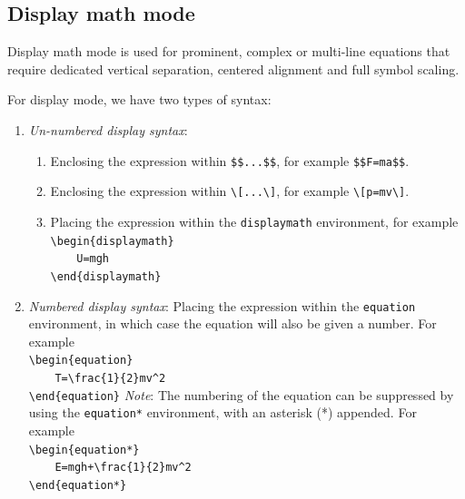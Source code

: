 	
	\newpage
	\subsection{Display math mode}
		Display math mode is used for prominent, complex or multi-line equations that require dedicated vertical separation, centered alignment and full symbol scaling.
		
		For display mode, we have two types of syntax:
		\begin{enumerate}
			\item \emph{Un-numbered display syntax}:
			\begin{enumerate}
				\item Enclosing the expression within \lstinline|$$...$$|, for example \lstinline|$$F=ma$$|.
				\item Enclosing the expression within \lstinline|\[...\]|, for example \lstinline|\[p=mv\]|.
				\item Placing the expression within the \lstinline|displaymath| environment, for example\\
				\lstinline|\begin{displaymath}|\\
					\lstinline|    U=mgh|\\
					\lstinline|\end{displaymath}|
			\end{enumerate}
			
			\item \emph{Numbered display syntax}: Placing the expression within the \lstinline|equation| environment, in which case the equation will also be given a number. For example\\
			\lstinline|\begin{equation}|\\
				\lstinline|    T=\frac{1}{2}mv^2|\\
			\lstinline|\end{equation}|
			\emph{Note}: The numbering of the equation can be suppressed by using the \lstinline|equation*| environment, with an asterisk (*) appended. For example\\
			\lstinline|\begin{equation*}|\\
				\lstinline|    E=mgh+\frac{1}{2}mv^2|\\
			\lstinline|\end{equation*}|
		\end{enumerate}
		

